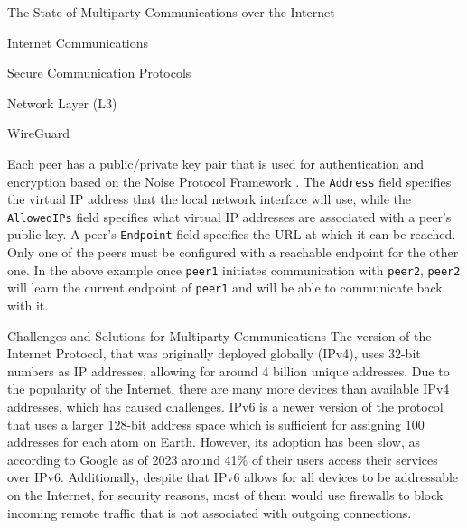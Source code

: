 \begin{frame}[fragile]{The State of Multiparty Communications over the Internet}
\begin{block}{Internet Communications}
\begin{block}{Secure Communication Protocols}
\begin{block}{Network Layer (L3)}
\begin{block}{WireGuard}
\begin{Shaded}
\begin{Highlighting}[]
\KeywordTok{[Peer]}
\OtherTok{=}
\OtherTok{=}
\end{Highlighting}
\end{Shaded}

Each peer has a public/private key pair that is used for authentication and encryption based on the Noise Protocol Framework \autocite{noiseDocs}. The \texttt{Address} field specifies the virtual IP address that the local network interface will use, while the \texttt{AllowedIPs} field specifies what virtual IP addresses are associated with a peer's public key. A peer's \texttt{Endpoint} field specifies the URL at which it can be reached. Only one of the peers must be configured with a reachable endpoint for the other one. In the above example once \texttt{peer1} initiates communication with \texttt{peer2}, \texttt{peer2} will learn the current endpoint of \texttt{peer1} and will be able to communicate back with it.

\end{block}
\end{block}
\end{block}

\begin{block}{Challenges and Solutions for Multiparty Communications}
\label{thesis__020-internet.md__challenges-and-solutions-for-multiparty-communications}
The version of the Internet Protocol, that was originally deployed globally (IPv4), uses 32-bit numbers as IP addresses, allowing for around 4 billion unique addresses. Due to the popularity of the Internet, there are many more devices than available IPv4 addresses, which has caused challenges. IPv6 is a newer version of the protocol that uses a larger 128-bit address space which is sufficient for assigning 100 addresses for each atom on Earth. However, its adoption has been slow, as according to Google\autocite{IPv6Google} as of 2023 around 41\% of their users access their services over IPv6. Additionally, despite that IPv6 allows for all devices to be addressable on the Internet, for security reasons, most of them would use firewalls to block incoming remote traffic that is not associated with outgoing connections.


\end{block}
\end{block}
\end{frame}
